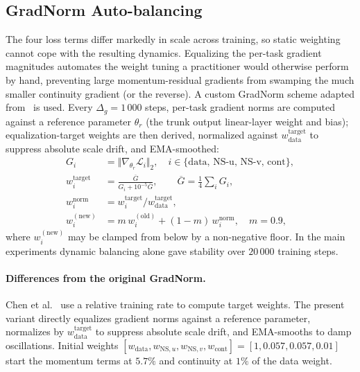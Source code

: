 \subsection{GradNorm Auto-balancing}
\label{subsec:gradnorm}

The four loss terms differ markedly in scale across training, so static weighting cannot cope with the resulting dynamics. Equalizing the per-task gradient magnitudes automates the weight tuning a practitioner would otherwise perform by hand, preventing large momentum-residual gradients from swamping the much smaller continuity gradient (or the reverse). A custom GradNorm scheme adapted from~\cite{Chen2018ICML, Sener2018MOO} is used. Every $\Delta_g = 1\,000$ steps, per-task gradient norms are computed against a reference parameter $\theta_r$ (the trunk output linear-layer weight and bias); equalization-target weights are then derived, normalized against $w_{\text{data}}^{\text{target}}$ to suppress absolute scale drift, and EMA-smoothed:
\begin{align}
    G_i &= \Vert \nabla_{\theta_r} \mathcal{L}_i \Vert_2,
        \quad i\in\{\text{data},\,\text{NS-u},\,\text{NS-v},\,\text{cont}\},\\
    w_i^{\text{target}} &= \frac{\overline{G}}{G_i + 10^{-5}\overline{G}},
        \qquad \overline{G} = \tfrac{1}{4}\sum_i G_i,\\
    w_i^{\text{norm}} &= w_i^{\text{target}} / w_{\text{data}}^{\text{target}},\\
    w_i^{(\text{new})} &= m\,w_i^{(\text{old})} + (1-m)\,w_i^{\text{norm}},\quad m = 0.9,
\end{align}
where $w_i^{(\text{new})}$ may be clamped from below by a non-negative floor. In the main experiments dynamic balancing alone gave stability over $20\,000$ training steps.

\paragraph{Differences from the original GradNorm.}
Chen et al.~\cite{Chen2018ICML} use a relative training rate to compute target weights. The present variant directly equalizes gradient norms against a reference parameter, normalizes by $w_{\text{data}}^{\text{target}}$ to suppress absolute scale drift, and EMA-smooths to damp oscillations. Initial weights $[w_{\text{data}}, w_{\text{NS},u}, w_{\text{NS},v}, w_{\text{cont}}] = [1, 0.057, 0.057, 0.01]$ start the momentum terms at $5.7\%$ and continuity at $1\%$ of the data weight.

